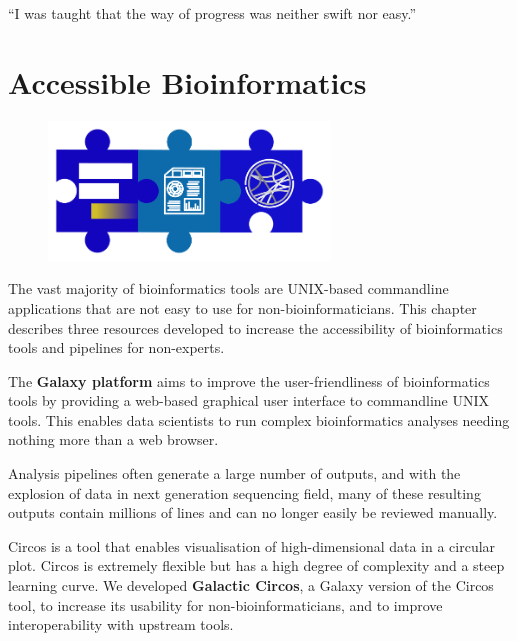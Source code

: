 \cleartorightpage\begin{savequote}[75mm]
``I was taught that the way of progress was neither swift nor easy.''
\end{savequote}

\chapter{Accessible Bioinformatics}\label{chapter:general}
\setcounter{figure}{-1}
\setcounter{table}{-1}
\setcounter{section}{-1}
\setcounter{NAT@ctr}{-1}

\begin{figure}[t!]
\includegraphics[height=10em]{frontmatter/images/chapter-header-technical.png}
\end{figure}
\setcounter{figure}{-1}
\setcounter{table}{-1}
\setcounter{section}{-1}

The vast majority of bioinformatics tools are UNIX-based commandline applications that are not easy to use for non-bioinformaticians. This chapter describes three resources developed to increase the accessibility of bioinformatics tools and pipelines for non-experts.

The \textbf{Galaxy platform} aims to improve the user-friendliness of bioinformatics tools by providing a web-based graphical user interface to commandline UNIX tools. This enables data scientists to run complex bioinformatics analyses needing nothing more than a web browser.

Analysis pipelines often generate a large number of outputs, and with the explosion of data in next generation sequencing field, many of these resulting outputs contain millions of lines and can no longer easily be reviewed manually.

Circos is a tool that enables visualisation of high-dimensional data in a circular plot. Circos is extremely flexible but has a high degree of complexity and a steep learning curve. We developed \textbf{Galactic Circos}, a Galaxy version of the Circos tool, to increase its usability for non-bioinformaticians, and to improve interoperability with upstream tools.

